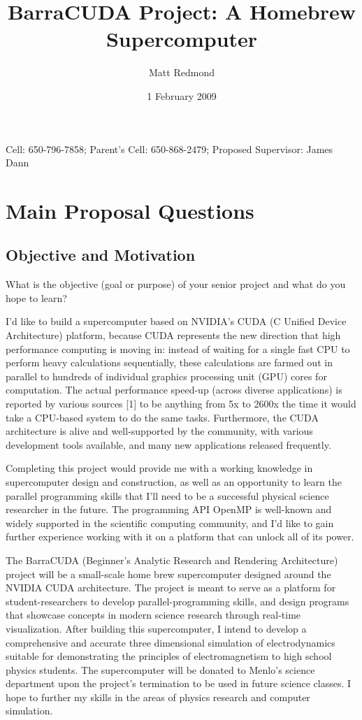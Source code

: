 \documentclass[10pt]{article}
\title{BarraCUDA Project: A Homebrew Supercomputer}  %
\author{Matt Redmond}      %
\date{1 February 2009}
\begin{document}
\maketitle
Cell: 650-796-7858; Parent's Cell: 650-868-2479; Proposed Supervisor: James Dann
\tableofcontents
\clearpage

\section{Main Proposal Questions}
\subsection{Objective and Motivation}
What is the objective (goal or purpose) of your senior project and what do you hope to learn?

I'd like to build a supercomputer based on NVIDIA's CUDA (C Unified Device Architecture) platform, because CUDA represents the new direction that high performance computing is moving in: instead of waiting for a single fast CPU to perform heavy calculations sequentially, these calculations are farmed out in parallel to hundreds of individual graphics processing unit (GPU) cores for computation. The actual performance speed-up (across diverse applications) is reported by various sources [1] to be anything from 5x to 2600x the time it would take a CPU-based system to do the same tasks.  Furthermore, the CUDA architecture is alive and well-supported by the community, with various development tools available, and many new applications released frequently. 

Completing this project would provide me with a working knowledge in supercomputer design and construction, as well as an opportunity to learn the parallel programming skills that I'll need to be a successful physical science researcher in the future. The programming API OpenMP is well-known and widely supported in the scientific computing community, and I'd like to gain further experience working with it on a platform that can unlock all of its power. 

The BarraCUDA (Beginner's Analytic Research and Rendering Architecture) project will be a small-scale home brew supercomputer designed around the NVIDIA CUDA architecture. The project is meant to serve as a platform for student-researchers to develop parallel-programming skills, and design programs that showcase concepts in modern science research through real-time visualization. After building this supercomputer, I intend to develop a comprehensive and accurate three dimensional simulation of electrodynamics suitable for demonstrating the principles of electromagnetism to high school physics students. The supercomputer will be donated to Menlo's science department upon the project's termination to be used in future science classes. I hope to further my skills in the areas of physics research and computer simulation.
\end{document}
